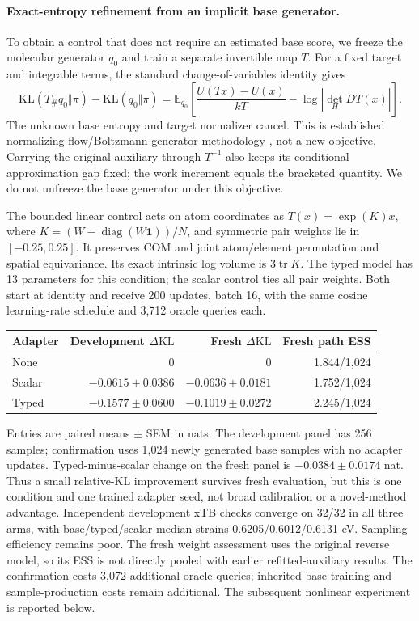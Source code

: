 \paragraph{Exact-entropy refinement from an implicit base generator.}
To obtain a control that does not require an estimated base score, we freeze
the molecular generator $q_0$ and train a separate invertible map $T$.
For a fixed target and integrable terms, the standard change-of-variables
identity gives
\[
\mathrm{KL}(T_\#q_0\Vert\pi)-\mathrm{KL}(q_0\Vert\pi)
=\mathbb E_{q_0}\!\left[\frac{U(Tx)-U(x)}{kT}
-\log|\det_H DT(x)|\right].
\]
The unknown base entropy and target normalizer cancel. This is established
normalizing-flow/Boltzmann-generator methodology \citep{noe2019boltzmann}, not
a new objective. Carrying the original auxiliary through $T^{-1}$ also keeps
its conditional approximation gap fixed; the work increment equals the bracketed
quantity. We do not unfreeze the base generator under this objective.

The bounded linear control acts on atom coordinates as $T(x)=\exp(K)x$, where
$K=(W-\operatorname{diag}(W\mathbf1))/N$, and symmetric pair weights lie in
$[-0.25,0.25]$. It preserves COM and joint atom/element permutation and spatial
equivariance. Its exact intrinsic log volume is $3\operatorname{tr}K$.
The typed model has 13 parameters for this condition; the scalar control ties
all pair weights. Both start at identity and receive 200 updates, batch 16,
with the same cosine learning-rate schedule and 3,712 oracle queries each.

\begin{center}
\begin{tabular}{lrrr}
\toprule
Adapter & Development $\Delta\mathrm{KL}$ & Fresh $\Delta\mathrm{KL}$ & Fresh path ESS\\
\midrule
None & 0 & 0 & 1.844/1,024\\
Scalar & $-0.0615\pm0.0386$ & $-0.0636\pm0.0181$ & 1.752/1,024\\
Typed & $-0.1577\pm0.0600$ & $-0.1019\pm0.0272$ & 2.245/1,024\\
\bottomrule
\end{tabular}
\end{center}

Entries are paired means $\pm$ SEM in nats. The development panel has 256
samples; confirmation uses 1,024 newly generated base samples with no adapter
updates. Typed-minus-scalar change on the fresh panel is
$-0.0384\pm0.0174$ nat. Thus a small relative-KL improvement survives fresh
evaluation, but this is one condition and one trained adapter seed, not broad
calibration or a novel-method advantage. Independent development xTB checks
converge on 32/32 in all three arms, with base/typed/scalar median strains
0.6205/0.6012/0.6131 eV. Sampling efficiency remains poor. The fresh weight
assessment uses the original reverse model, so its ESS is not directly pooled
with earlier refitted-auxiliary results. The confirmation costs 3,072 additional
oracle queries; inherited base-training and sample-production costs remain
additional. The subsequent nonlinear experiment is reported below.

